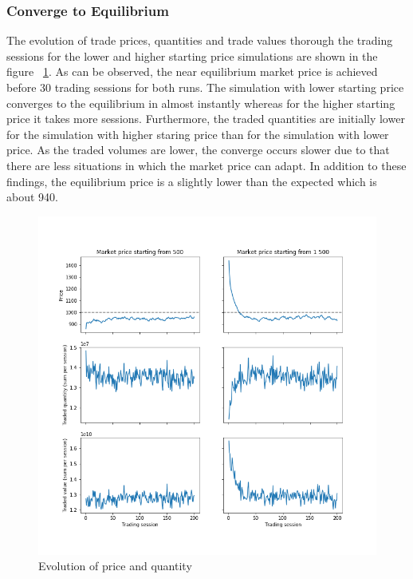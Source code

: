 

\subsubsection{Converge to Equilibrium}
The evolution of trade prices, quantities and trade values thorough
the trading sessions for the lower and higher starting price simulations 
are shown in the figure ~\ref{fig:basic_trades}. As can be observed,
the near equilibrium market price is achieved before 30 trading
sessions for both runs. The simulation with lower starting price converges
to the equilibrium in almost instantly whereas for the higher starting
price it takes more sessions. Furthermore, the traded quantities are
initially lower for the simulation with higher staring price than 
for the simulation with lower price. As the traded volumes are lower,
the converge occurs slower due to that there are less situations in
which the market price can adapt. In addition to these findings, 
the equilibrium price is a slightly lower than the expected which is 
about 940.

\begin{figure}
    \includegraphics[width=\linewidth]{plots/basic_trades.png}
    \caption{Evolution of price and quantity}
    \label{fig:basic_trades}
\end{figure}

